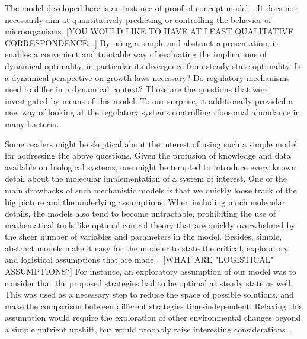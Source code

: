 The model developed here is an instance of proof-of-concept model~\cite{servedio_not_2014}.
It does not necessarily aim at quantitatively predicting or controlling the behavior of microorganisms. [YOU WOULD LIKE TO HAVE AT LEAST QUALITATIVE CORRESPONDENCE...]
By using a simple and abstract representation, it enables a convenient and tractable way of evaluating the implications of dynamical optimality, in particular its divergence from steady-state optimality.
Is a dynamical perspective on growth laws necessary?
Do regulatory mechanisms need to differ in a dynamical context?
Those are the questions that were investigated by means of this model. 
To our surprise, it additionally provided a new way of looking at the regulatory systems controlling ribosomal abundance in many bacteria.

Some readers might be skeptical about the interest of using such a simple model for addressing the above questions.
Given the profusion of knowledge and data available on biological systems, one might be tempted to introduce every known detail about the molecular implementation of a system of interest.
One of the main drawbacks of such mechanistic models is that we quickly loose track of the big picture and the underlying assumptions.
When including much molecular details, the models also tend to become untractable, prohibiting the use of mathematical tools like optimal control theory that are quickly overwhelmed by the sheer number of variables and parameters in the model.
Besides, simple, abstract models make it easy for the modeler to state the critical, exploratory, and logistical assumptions that are made~\cite{servedio_not_2014}. [WHAT ARE "LOGISTICAL" ASSUMPTIONS?]
For instance, an exploratory assumption of our model was to consider that the proposed strategies had to be optimal at steady state as well.
This was used as a necessary step to reduce the space of possible solutions, and make the comparison between different strategies time-independent.
Relaxing this assumption would require the exploration of other environmental changes beyond a simple nutrient upshift, but would probably raise interesting considerations~\cite{geisel_constitutive_2011,lopez-maury_tuning_2008,lambert_memory_2014,kussell_phenotypic_2005}.

